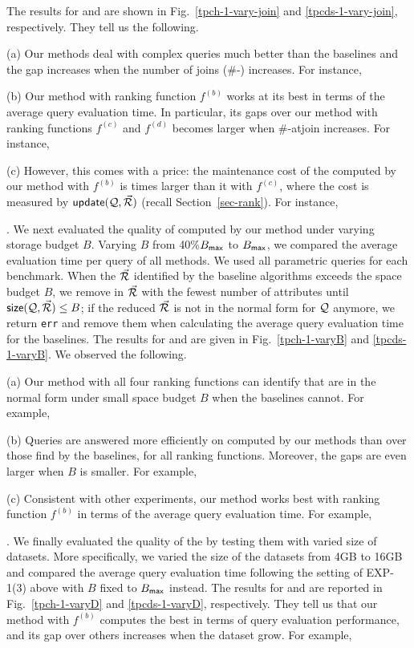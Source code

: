 {The results for \tpch and \tpcds are shown in
Fig.~\ref{tpch-1-vary-join} and \ref{tpcds-1-vary-join},
respectively. They tell us the following. 

\sstab (a) Our methods deal with complex queries much better than
the baselines and the gap increases when the number of joins
(\#-) increases. 
For instance, 

\sstab (b) Our method with ranking function $f^{(b)}$ works at
its best in terms of the average query evaluation time. In
particular, its gaps over our method with ranking functions
$f^{(c)}$ and $f^{(d)}$ becomes larger when \#-at{join} increases.
For instance, 


\sstab (c) However, this comes with a price: the maintenance cost
of the \bdss computed by our method with $f^{(b)}$ is \xx times
larger than it with $f^{(c)}$, where the cost is measured by
${\mathsf{update}}(\mathcal Q, \vec{{\mathcal R}})$ (recall Section~\ref{sec-rank}). 
For instance, 


. We next evaluated the
quality of \bdss computed by our method under varying storage
budget $B$. Varying $B$ from 40\%$B_{\protect\mathsf{max}}$ to
$B_{\protect\mathsf{max}}$, we compared the average evaluation time per query
of all methods. We used all parametric queries for each
benchmark. When the \bdss $\vec{{\mathcal R}}$ identified by the baseline algorithms
exceeds the space budget $B$, we remove \bss in $\vec{{\mathcal R}}$ with
the fewest number of attributes until ${\mathsf{size}}(\mathcal Q, \vec{{\mathcal R}})\leq B$;
if the reduced $\vec{{\mathcal R}}$ is not in the normal form for $\mathcal Q$
anymore, we return \texttt{err} and remove them when calculating
the average query evaluation time for the baselines. 
The results for \tpch and \tpcds are given in
Fig.~\ref{tpch-1-varyB} and \ref{tpcds-1-varyB}.
We observed the following.

\sstab (a) Our method with all four ranking functions can
identify \bdss that are in the normal form under small space
budget $B$ when the baselines cannot.
For example, 


\sstab (b) Queries are answered more efficiently on \bdss
computed by our methods than over those find by the baselines,
for all ranking functions.  Moreover, the gaps are even larger
when $B$ is smaller. For example, 


\sstab (c) Consistent with other experiments, our method works
best with ranking function $f^{(b)}$ in terms of the average
query evaluation time. For example, 


.
We finally evaluated the quality of the \bdss by testing them
with varied size of datasets. More specifically, we varied the
size of the datasets from 4GB to 16GB and compared the average
query evaluation time following the setting of EXP-1(3) above
with $B$ fixed to $B_{\protect\mathsf{max}}$ instead.
The results for \tpch and \tpcds are reported in
Fig.~\ref{tpch-1-varyD} and \ref{tpcds-1-varyD}, respectively.
They tell us that our method with $f^{(b)}$ computes the best
\bdss in terms of query evaluation performance, and its gap over
others increases when the dataset grow. For example, 


}
